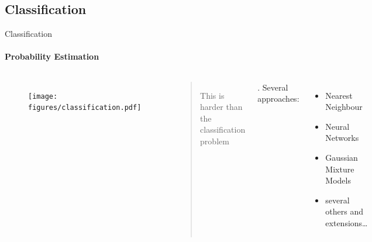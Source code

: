 \documentclass[compress]{beamer}
\begin{document}
\subsection{Classification}

\begin{frame}{Classification}
\framesubtitle{Probability Estimation}

\begin{columns}[t]
    \begin{figure}
        \texttt{[image: figures/classification.pdf]}
    \end{figure}
    \begin{quote}This is harder than the classification problem\cite{cortes1995support}\end{quote}.
    Several approaches\cite{bishop2006pattern}:
    \begin{itemize}
        \item Nearest Neighbour
        \item Neural Networks
        \item Gaussian Mixture Models
        \item several others and extensions\dots 
    \end{itemize}
\end{columns}
\end{frame}
\end{document}
